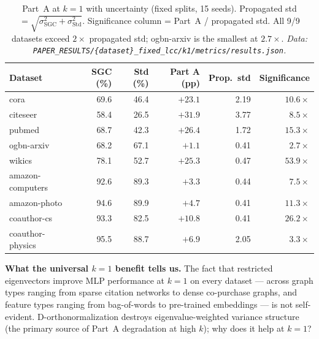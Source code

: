 \documentclass[11pt]{article}
\begin{document}
\begin{table}[H]
\centering\small\setlength{\tabcolsep}{5pt}
\caption{Part~A at $k{=}1$ with uncertainty (fixed splits, 15 seeds).
Propagated std $= \sqrt{\sigma_{\mathrm{SGC}}^2 + \sigma_{\mathrm{Std}}^2}$.
Significance column = Part~A / propagated std.
All 9/9 datasets exceed $2\times$ propagated std; ogbn-arxiv is the smallest at $2.7\times$.
\textit{\scriptsize Data: \texttt{PAPER\_RESULTS/\{dataset\}\_fixed\_lcc/k1/metrics/results.json}.}}
\label{tab:part_a_k1_stds}
\begin{tabular}{lrrrrr}
\toprule
Dataset & SGC (\%) & Std (\%) & Part A (pp) & Prop.\ std & Significance \\
\midrule
cora              & 69.6 & 46.4 & $+23.1$ & 2.19 & $10.6\times$ \\
citeseer          & 58.4 & 26.5 & $+31.9$ & 3.77 & $8.5\times$  \\
pubmed            & 68.7 & 42.3 & $+26.4$ & 1.72 & $15.3\times$ \\
ogbn-arxiv        & 68.2 & 67.1 & $+1.1$  & 0.41 & $2.7\times$  \\
wikics            & 78.1 & 52.7 & $+25.3$ & 0.47 & $53.9\times$ \\
amazon-computers  & 92.6 & 89.3 & $+3.3$  & 0.44 & $7.5\times$  \\
amazon-photo      & 94.6 & 89.9 & $+4.7$  & 0.41 & $11.3\times$ \\
coauthor-cs       & 93.3 & 82.5 & $+10.8$ & 0.41 & $26.2\times$ \\
coauthor-physics  & 95.5 & 88.7 & $+6.9$  & 2.05 & $3.3\times$  \\
\bottomrule
\end{tabular}
\end{table}

\noindent\textbf{What the universal $k{=}1$ benefit tells us.}
The fact that restricted eigenvectors improve MLP performance at $k{=}1$ on every
dataset — across graph types ranging from sparse citation networks to dense co-purchase
graphs, and feature types ranging from bag-of-words to pre-trained embeddings — is not
self-evident.  D-orthonormalization destroys eigenvalue-weighted variance structure
(the primary source of Part~A degradation at high $k$); why does it help at $k{=}1$?
\end{document}
